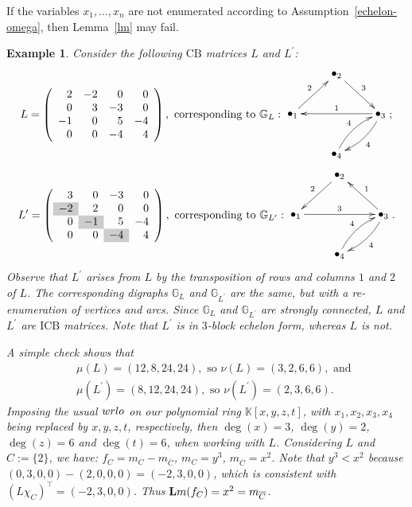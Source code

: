 \documentclass[10pt]{amsart}
\newcommand{\y}{\cellcolor{gray!40}}
\newcommand{\mbk}{\mbox{$\mathbb{K}$}}
\newcommand{\mbg}{\mbox{$\mathbb{G}$}}
\newcommand{\lm}{\mbox{${\bf L}{\rm m}$}}
\newcommand{\icb}{\mbox{$\mathrm{ICB}$}}
\newcommand{\cb}{\mbox{$\mathrm{CB}$}}
\newcommand{\wrlo}{\mbox{${\rm wrlo}$}}
\newtheorem{example}[cdrthm]{Example}
\theoremstyle{definition}
\theoremstyle{remark}
\begin{document}
If the variables $x_1,\ldots ,x_n$ are not enumerated according to
Assumption~\ref{echelon-omega}, then Lemma~\ref{lm} may fail.

\begin{example}
Consider the following $\cb$ matrices $L$ and $L^{\prime}$:
\begin{eqnarray*}
L=\left(\begin{array}{rrrr}
2&-2&0&0\\0&3&-3&0\\-1&0&5&-4\\0&0&-4&4
\end{array}\right), \mbox{ corresponding to }\mbg_L:
\vcenter{\xymatrix{ & \bullet_2 \ar[dr]^3 & \\ \bullet_1 \ar[ur]^2 & &
    \bullet_3 \ar[ll]_1 \ar@/^/[dl]^4 \\ & \bullet_4 \ar@/^/[ur]^4}};
\end{eqnarray*}
\begin{eqnarray*}
L^{\prime}=\left(\begin{array}{rrrr}
3&0&-3&0\\\y-2&2&0&0\\0&\y-1&5&-4\\0&0&\y-4&4
\end{array}\right), \mbox{ corresponding to }\mbg_{L^{\prime}}:
\vcenter{\xymatrix{ & \bullet_2 \ar[dl]_2 & \\ \bullet_1 \ar[rr]^3 & &
    \bullet_3 \ar[ul]_1 \ar@/^/[dl]^4 \\ & \bullet_4 \ar@/^/[ur]^4}}.
\end{eqnarray*}
Observe that $L^{\prime}$ arises from $L$ by the transposition of rows
and columns $1$ and $2$ of $L$. The corresponding digraphs $\mbg_L$
and $\mbg_{L^{\prime}}$ are the same, but with a re-enumeration of
vertices and arcs. Since $\mbg_L$ and $\mbg_{L^{\prime}}$ are strongly
connected, $L$ and $L^{\prime}$ are $\icb$ matrices. Note that
$L^{\prime}$ is in $3$-block echelon form, whereas $L$ is not.

A simple check shows that
\begin{eqnarray*}
&& \mu(L)=(12,8,24,24), \mbox{ so }\nu(L)=(3,2,6,6),\mbox{ and }\\&&
\mu(L^{\prime})=(8,12,24,24),\mbox{ so }\nu(L^{\prime})=(2,3,6,6).
\end{eqnarray*}
Imposing the usual $\wrlo$ on our polynomial ring $\mbk[x,y,z,t]$,
with $x_1,x_2,x_3,x_4$ being replaced by $x,y,z,t$, respectively, then
$\deg(x)=3$, $\deg(y)=2$, $\deg(z)=6$ and $\deg(t)=6$, when working
with $L$. Considering $L$ and $C:=\{2\}$, we have:
$f_{C}=m_{C}-m_{\overline{C}}$, $m_{C}=y^3$,
$m_{\overline{C}}=x^2$. Note that $y^3<x^2$ because
$(0,3,0,0)-(2,0,0,0)=(-2,3,0,0)$, which is consistent with
$(L\chi_C)^{\top}=(-2,3,0,0)$. Thus $\lm(f_C)=x^2=m_{\overline{C}}$.
\end{example}
\end{document}
